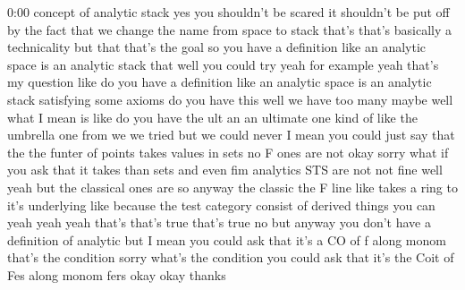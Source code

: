 \begin{unfinished}{0:00}
concept  of  analytic  stack  yes  you
shouldn't  be  scared  it  shouldn't  be  put
off  by  the  fact  that  we  change  the  name
from  space  to  stack  that's  that's
basically  a  technicality  but  that  that's
the  goal  so  you  have  a  definition  like
an  analytic  space  is  an  analytic  stack
that  well  you  could  try  yeah  for  example
yeah  that's  my  question  like  do  you  have
a  definition  like  an  analytic  space  is
an  analytic  stack  satisfying  some  axioms
do  you  have
this  well  we  have  too  many  maybe  well
what  I  mean  is  like  do  you  have  the  ult
an  an  ultimate  one  kind  of  like  the
umbrella  one  from  we  we  tried  but  we
could
never  I  mean  you  could  just  say  that  the
the  funter  of  points  takes  values  in
sets
no  F  ones  are  not  okay  sorry
what  if  you  ask  that  it  takes  than  sets
and  even  fim  analytics  STS  are  not  not
fine  well  yeah  but  the  classical  ones
are  so  anyway  the  classic  the  F  line
like  takes  a  ring  to  it's
underlying  like  because  the  test
category  consist  of  derived  things  you
can  yeah  yeah  yeah  that's  that's  true
that's  true  no  but  anyway  you  don't  have
a  definition  of  analytic  but  I  mean  you
could  ask  that  it's  a  CO  of  f  along
monom
that's  the
condition  sorry  what's  the  condition  you
could  ask  that  it's  the  Coit  of  Fes
along  monom
fers
okay  okay
thanks
\end{unfinished}